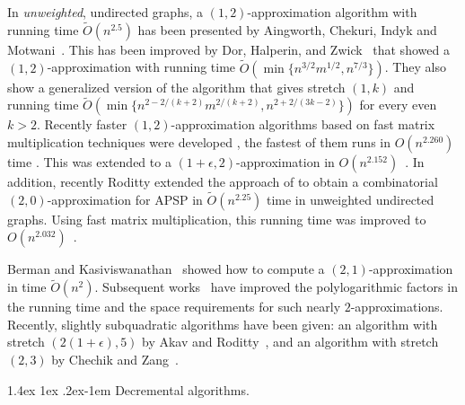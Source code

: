 \documentclass[11pt]{article}
\makeatletter
\theoremstyle{definition}
\theoremstyle{remark}
\renewcommand{\paragraph}{%
  \@startsection{paragraph}{4}%
  {\z@}{1.4ex \@plus 1ex \@minus .2ex}{-1em}%
  {\normalfont\normalsize\bfseries}%
}
\makeatother
\begin{document}
\begin{titlepage}
In \emph{unweighted}, undirected graphs, a $ (1, 2) $-approximation algorithm with running time $ \tilde O (n^{2.5}) $ has been presented by Aingworth, Chekuri, Indyk and Motwani~\cite{AingworthCIM99}. This has been improved by Dor, Halperin, and Zwick~\cite{DHZ00} that showed a $(1,2)$-approximation with running time $\tilde{O}(\min\{n^{3/2}m^{1/2}, n^{7/3} \})$. They also show a generalized version of the algorithm that gives stretch $ (1, k) $ and running time ${\tilde{O}}(\min\{n^{2-{2}/{(k+2)}}m^{{2}/{(k+2)}}, n^{2+{2}/{(3k-2)}}\})$ for every even $k>2$.
Recently faster $(1,2)$-approximation algorithms based on fast matrix multiplication techniques were developed \cite{DengKRWZ22,durr2023improved}, the fastest of them runs in $O(n^{2.260})$ time \cite{durr2023improved}. This was extended to a $(1+\epsilon,2)$-approximation in $O(n^{2.152})$~\cite{DoryFKNVV23}. In addition, recently Roditty \cite{Roditty23} extended the approach of \cite{DHZ00} to obtain a combinatorial $(2,0)$-approximation for APSP in $\tilde{O}(n^{2.25})$ time in unweighted undirected graphs.  Using fast matrix multiplication, this running time was improved to $O(n^{2.032})$~\cite{DoryFKNVV23,saha2024faster}.


Berman and Kasiviswanathan~\cite{BermanK07} showed how to compute a $ (2, 1) $-approximation in time $ \tilde O (n^2) $.
Subsequent works~\cite{BaswanaGS09,BaswanaK10,PatrascuR14,Sommer16,Knudsen17} have improved the polylogarithmic factors in the running time and the space requirements for such nearly $2$-approximations.
Recently, slightly subquadratic algorithms have been given: an algorithm with stretch $ (2 (1 + \epsilon), 5)$ by Akav and Roditty~\cite{AkavR20}, and an algorithm with stretch $(2,3)$ by Chechik and Zang~\cite{ChechikZ22}.




\paragraph{Decremental algorithms.}


\end{titlepage}
\end{document}
